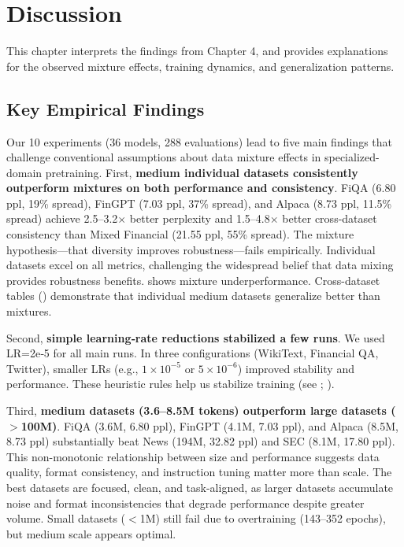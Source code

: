 \chapter{Discussion}

This chapter interprets the findings from Chapter 4, and provides explanations for the observed mixture effects, training dynamics, and generalization patterns.

\section{Key Empirical Findings}

Our 10 experiments (36 models, 288 evaluations) lead to five main findings that challenge conventional assumptions about data mixture effects in specialized-domain pretraining. First, \textbf{medium individual datasets consistently outperform mixtures on both performance and consistency}. FiQA (6.80 ppl, 19\% spread), FinGPT (7.03 ppl, 37\% spread), and Alpaca (8.73 ppl, 11.5\% spread) achieve 2.5–3.2$\times$ better perplexity and 1.5–4.8$\times$ better cross-dataset consistency than Mixed Financial (21.55 ppl, 55\% spread). The mixture hypothesis—that diversity improves robustness—fails empirically. Individual datasets excel on all metrics, challenging the widespread belief that data mixing provides robustness benefits.  shows mixture underperformance. Cross-dataset tables () demonstrate that individual medium datasets generalize better than mixtures.

Second, \textbf{simple learning‑rate reductions stabilized a few runs}. We used LR=2e‑5 for all main runs. In three configurations (WikiText, Financial QA, Twitter), smaller LRs (e.g., $1\times10^{-5}$ or $5\times10^{-6}$) improved stability and performance. These heuristic rules help us stabilize training (see ; ).

Third, \textbf{medium datasets (3.6–8.5M tokens) outperform large datasets ($>$100M)}. FiQA (3.6M, 6.80 ppl), FinGPT (4.1M, 7.03 ppl), and Alpaca (8.5M, 8.73 ppl) substantially beat News (194M, 32.82 ppl) and SEC (8.1M, 17.80 ppl). This non-monotonic relationship between size and performance suggests data quality, format consistency, and instruction tuning matter more than scale. The best datasets are focused, clean, and task-aligned, as larger datasets accumulate noise and format inconsistencies that degrade performance despite greater volume. Small datasets ($<$1M) still fail due to overtraining (143–352 epochs), but medium scale appears optimal.

